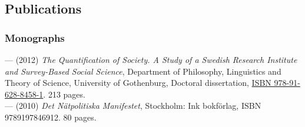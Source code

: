 \documentclass[a4paper,11pt,oneside]{article}
\begin{document}






\clearpage
\setlength\parindent{0cm}
\subsection{Publications}

\subsubsection{Monographs}
    --- (2012) \emph{The Quantification of Society. A Study of a Swedish Research Institute
    and Survey-Based Social Science}, Department of Philosophy, Linguistics and Theory of Science, University of Gothenburg, Doctoral dissertation,  \href{https://gupea.ub.gu.se/handle/2077/28807}{ISBN 978-91-628-8458-1}. 213 pages.\\
    --- (2010) \emph{Det Nätpolitiska Manifestet}, Stockholm: Ink bokförlag, ISBN 9789197846912. 80 pages.
\end{document}

